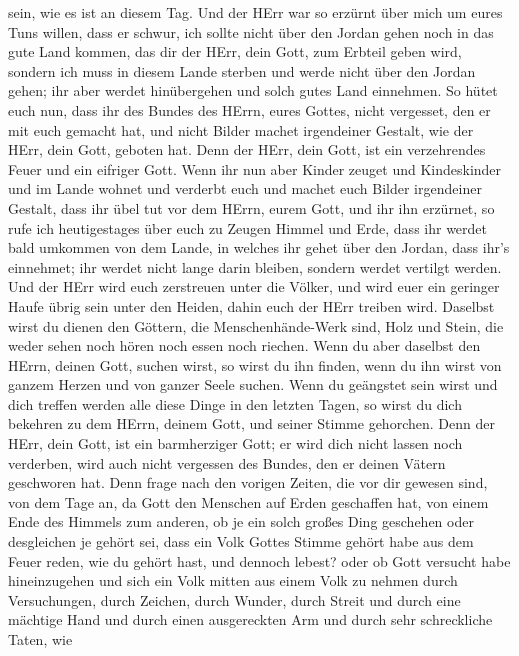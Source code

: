 sein, wie es ist an diesem Tag.  Und der HErr war so
erzürnt über mich um eures Tuns willen, dass er schwur, ich sollte nicht
über den Jordan gehen noch in das gute Land kommen, das dir der HErr,
dein Gott, zum Erbteil geben wird,  sondern ich muss in
diesem Lande sterben und werde nicht über den Jordan gehen; ihr aber
werdet hinübergehen und solch gutes Land einnehmen.  So
hütet euch nun, dass ihr des Bundes des HErrn, eures Gottes, nicht
vergesset, den er mit euch gemacht hat, und nicht Bilder machet
irgendeiner Gestalt, wie der HErr, dein Gott, geboten hat. 
Denn der HErr, dein Gott, ist ein verzehrendes Feuer und ein eifriger
Gott.  Wenn ihr nun aber Kinder zeuget und Kindeskinder und
im Lande wohnet und verderbt euch und machet euch Bilder irgendeiner
Gestalt, dass ihr übel tut vor dem HErrn, eurem Gott, und ihr ihn
erzürnet,  so rufe ich heutigestages über euch zu Zeugen
Himmel und Erde, dass ihr werdet bald umkommen von dem Lande, in welches
ihr gehet über den Jordan, dass ihr's einnehmet; ihr werdet nicht lange
darin bleiben, sondern werdet vertilgt werden.  Und der
HErr wird euch zerstreuen unter die Völker, und wird euer ein geringer
Haufe übrig sein unter den Heiden, dahin euch der HErr treiben wird.
 Daselbst wirst du dienen den Göttern, die
Menschenhände-Werk sind, Holz und Stein, die weder sehen noch hören noch
essen noch riechen.  Wenn du aber daselbst den HErrn,
deinen Gott, suchen wirst, so wirst du ihn finden, wenn du ihn wirst von
ganzem Herzen und von ganzer Seele suchen.  Wenn du
geängstet sein wirst und dich treffen werden alle diese Dinge in den
letzten Tagen, so wirst du dich bekehren zu dem HErrn, deinem Gott, und
seiner Stimme gehorchen.  Denn der HErr, dein Gott, ist ein
barmherziger Gott; er wird dich nicht lassen noch verderben, wird auch
nicht vergessen des Bundes, den er deinen Vätern geschworen hat.
 Denn frage nach den vorigen Zeiten, die vor dir gewesen
sind, von dem Tage an, da Gott den Menschen auf Erden geschaffen hat,
von einem Ende des Himmels zum anderen, ob je ein solch großes Ding
geschehen oder desgleichen je gehört sei,  dass ein Volk
Gottes Stimme gehört habe aus dem Feuer reden, wie du gehört hast, und
dennoch lebest?  oder ob Gott versucht habe hineinzugehen
und sich ein Volk mitten aus einem Volk zu nehmen durch Versuchungen,
durch Zeichen, durch Wunder, durch Streit und durch eine mächtige Hand
und durch einen ausgereckten Arm und durch sehr schreckliche Taten, wie
